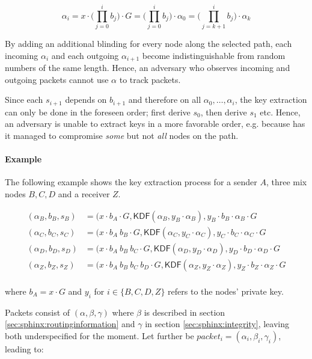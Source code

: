$$ \alpha_i = x \cdot \biggl(\prod_{j=0}^{i} b_j \biggr) \cdot G = \biggl(\prod_{j=0}^{i} b_j \biggr) \cdot \alpha_0 = \biggl(\prod_{j=k+1}^{i} b_j \biggr) \cdot \alpha_k $$

By adding an additional blinding for every node along the selected path, each incoming $\alpha_i$ and each outgoing $\alpha_{i+1}$ become indistinguishable from random numbers of the same length. Hence, an adversary who observes incoming and outgoing packets cannot use $\alpha$ to track packets.

Since each $s_{i+1}$ depends on $b_{i+1}$ and therefore on all $\alpha_0, \dots , \alpha_i$, the key extraction can only be done in the foreseen order; first derive $s_0$, then derive $s_1$ etc. Hence, an adversary is unable to extract keys in a more favorable order, e.g. because has it managed to compromise \textit{some} but not \textit{all} nodes on the path.

\paragraph{Example}

The following example shows the key extraction process for a sender $A$, three mix nodes $B,C,D$ and a receiver $Z$.

\begin{align*}
    (\alpha_B,b_B,s_B) & = (x \cdot b_A \cdot G,\textsf{KDF}(\alpha_B,y_B \cdot \alpha_B), y_B \cdot b_B \cdot \alpha_B \cdot G                   \\
    (\alpha_C,b_C,s_C) & = (x \cdot b_A \ b_B \cdot G,\textsf{KDF}(\alpha_C,y_C \cdot \alpha_C), y_C \cdot b_C \cdot \alpha_C \cdot G             \\
    (\alpha_D,b_D,s_D) & = (x \cdot b_A \ b_B \ b_C \cdot G,\textsf{KDF}(\alpha_D,y_D \cdot \alpha_D), y_D \cdot b_D \cdot \alpha_D \cdot G       \\
    (\alpha_Z,b_Z,s_Z) & = (x \cdot b_A \ b_B \ b_C \ b_D \cdot G,\textsf{KDF}(\alpha_Z,y_Z \cdot \alpha_Z), y_Z \cdot b_Z \cdot \alpha_Z \cdot G \\
\end{align*}

where $b_A = x \cdot G$ and $y_i$ for $i \in \{ B,C,D,Z \}$ refers to the nodes' private key.

Packets consist of $(\alpha, \beta, \gamma)$ where $\beta$ is described in section \ref{sec:sphinx:routinginformation} and $\gamma$ in section \ref{sec:sphinx:integrity}, leaving both underspecified for the moment. Let further be $packet_i = (\alpha_i, \beta_i, \gamma_i)$, leading to:

